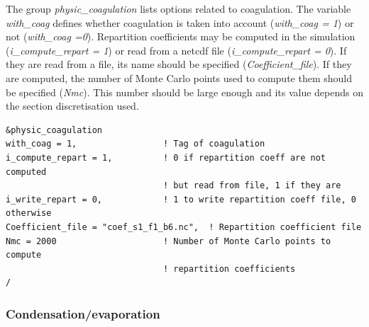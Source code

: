 \documentclass[a4paper,11pt]{article}
\begin{document}
The group {\textit{physic\_coagulation}} lists options related to coagulation. The variable {\textit{with\_coag}} defines whether coagulation is taken into account ({\textit{with\_coag = 1}}) or not ({\textit{with\_coag =0}}). 
Repartition coefficients may be computed in the simulation ({\textit{i\_compute\_repart = 1}}) or read from a netcdf file ({\textit{i\_compute\_repart = 0}}). If they are read from a file, its name should be specified ({\textit{Coefficient\_file}}). If they are computed, the number of Monte Carlo points used to compute them should be specified ({\textit{Nmc}}). This number should be large enough and its value depends on the section discretisation used.


\begin{verbatim}
&physic_coagulation
with_coag = 1,                 ! Tag of coagulation
i_compute_repart = 1,          ! 0 if repartition coeff are not computed 
                               ! but read from file, 1 if they are 
i_write_repart = 0,            ! 1 to write repartition coeff file, 0 otherwise
Coefficient_file = "coef_s1_f1_b6.nc",  ! Repartition coefficient file
Nmc = 2000                     ! Number of Monte Carlo points to compute
                               ! repartition coefficients
/
\end{verbatim}
          
\subsubsection{Condensation/evaporation}
\end{document}

